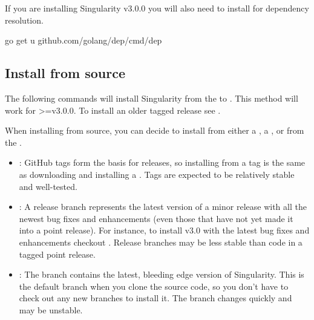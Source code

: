 \documentclass[letterpaper,10pt,english]{sphinxmanual}
\begin{document}
If you are installing Singularity v3.0.0 you will also need to install 
for dependency resolution.

%
\begin{sphinxVerbatim}[commandchars=\\\{\}]
\PYGZdl{} go get \PYGZhy{}u github.com/golang/dep/cmd/dep
\end{sphinxVerbatim}


\subsection{Install from source}
\label{\detokenize{installation:install-from-source}}
The following commands will install Singularity from the  to . This method will
work for \textgreater{}=v3.0.0. To install an older tagged release see .

When installing from source, you can decide to install from either a , a
, or from the .
\begin{itemize}
\item {} 
: GitHub tags form the basis for releases, so installing from a tag is the same as downloading and installing a .  Tags are expected to be relatively stable and well-tested.

\item {} 
: A release branch represents the latest version of a minor release with all the newest bug fixes and enhancements (even those that have not yet made it into a point release).  For instance, to install v3.0 with the latest bug fixes and enhancements checkout .  Release branches may be less stable than code in a tagged point release.

\item {} 
: The  branch contains the latest, bleeding edge version of Singularity. This is the default branch when you clone the source code, so you don’t have to check out any new branches to install it. The  branch changes quickly and may be unstable.

\end{itemize}
\end{document}
